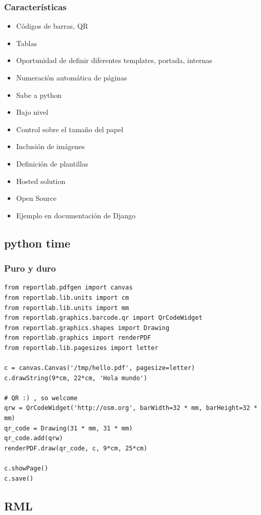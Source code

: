 \documentclass[8pt,xcolor={usenames,dvipsnames}]{beamer}
\begin{document}
\begin{frame}
  \frametitle{Características}
  \begin{itemize}
  \item Códigos de barras, QR
  \item Tablas
  \item Oportunidad de definir diferentes templates, portada, internas
  \item Numeración automática de páginas
  \item Sabe a python
  \item Bajo nivel
  \item Control sobre el tamaño del papel
  \item Inclusión de imágenes
  \item Definición de plantillas
  \item Hosted solution
  \item Open Source
  \item Ejemplo en documentación de Django
  \end{itemize}
\end{frame}

\subsection{python time}
  
\begin{frame}[fragile]
\frametitle{Puro y duro}
\begin{verbatim}
from reportlab.pdfgen import canvas  
from reportlab.lib.units import cm
from reportlab.lib.units import mm
from reportlab.graphics.barcode.qr import QrCodeWidget
from reportlab.graphics.shapes import Drawing
from reportlab.graphics import renderPDF
from reportlab.lib.pagesizes import letter

c = canvas.Canvas('/tmp/hello.pdf', pagesize=letter)  
c.drawString(9*cm, 22*cm, 'Hola mundo')

# QR :) , so welcome
qrw = QrCodeWidget('http://osm.org', barWidth=32 * mm, barHeight=32 * mm)
qr_code = Drawing(31 * mm, 31 * mm)
qr_code.add(qrw)
renderPDF.draw(qr_code, c, 9*cm, 25*cm)

c.showPage()  
c.save()

\end{verbatim}
\end{frame}

\subsection{RML}
\end{document}
